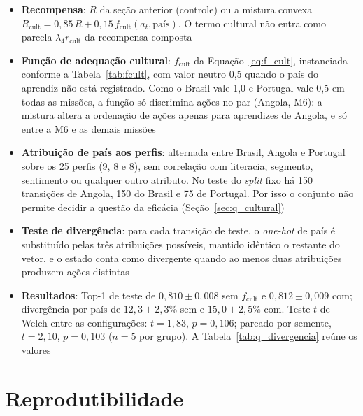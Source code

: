 \begin{itemize}
    \item \textbf{Recompensa}: $R$ da seção anterior (controle) ou a mistura convexa $R_{\text{cult}} = 0{,}85\, R + 0{,}15\, f_{\text{cult}}(a_t, \text{país})$. O termo cultural não entra como parcela $\lambda_4 r_{\text{cult}}$ da recompensa composta
    \item \textbf{Função de adequação cultural}: $f_{\text{cult}}$ da Equação~\ref{eq:f_cult}, instanciada conforme a Tabela~\ref{tab:fcult}, com valor neutro 0,5 quando o país do aprendiz não está registrado. Como o Brasil vale 1,0 e Portugal vale 0,5 em todas as missões, a função só discrimina ações no par (Angola, M6): a mistura altera a ordenação de ações apenas para aprendizes de Angola, e só entre a M6 e as demais missões
    \item \textbf{Atribuição de país aos perfis}: alternada entre Brasil, Angola e Portugal sobre os 25 perfis (9, 8 e 8), sem correlação com literacia, segmento, sentimento ou qualquer outro atributo. No teste do \emph{split} fixo há 150 transições de Angola, 150 do Brasil e 75 de Portugal. Por isso o conjunto não permite decidir a questão da eficácia (Seção~\ref{sec:q_cultural})
    \item \textbf{Teste de divergência}: para cada transição de teste, o \textit{one-hot} de país é substituído pelas três atribuições possíveis, mantido idêntico o restante do vetor, e o estado conta como divergente quando ao menos duas atribuições produzem ações distintas
    \item \textbf{Resultados}: Top-1 de teste de $0{,}810 \pm 0{,}008$ sem $f_{\text{cult}}$ e $0{,}812 \pm 0{,}009$ com; divergência por país de $12{,}3 \pm 2{,}3\%$ sem e $15{,}0 \pm 2{,}5\%$ com. Teste $t$ de Welch entre as configurações: $t = 1{,}83$, $p = 0{,}106$; pareado por semente, $t = 2{,}10$, $p = 0{,}103$ ($n = 5$ por grupo). A Tabela~\ref{tab:q_divergencia} reúne os valores
\end{itemize}

\section*{Reprodutibilidade}
\label{sec:apendice_reprodutibilidade}

